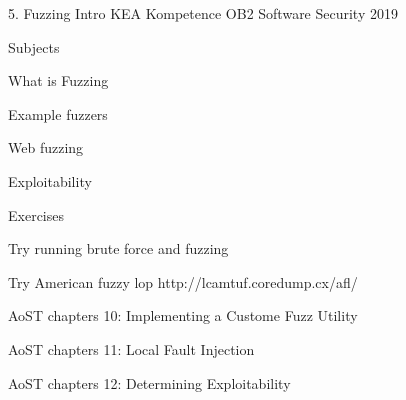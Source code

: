\documentclass[Screen16to9,17pt]{foils}
\begin{document}
\mytitlepage
{5. Fuzzing Intro}
{KEA Kompetence OB2 Software Security 2019}


\begin{list1}
\item Subjects
\begin{list2}
\item What is Fuzzing
\item Example fuzzers
\item Web fuzzing
\item Exploitability
\end{list2}
\item Exercises
\begin{list2}
\item Try running brute force and fuzzing
\item Try American fuzzy lop http://lcamtuf.coredump.cx/afl/
\end{list2}
\end{list1}


\begin{list1}
\item AoST chapters 10: Implementing a Custome Fuzz Utility
\item AoST chapters 11: Local Fault Injection
\item AoST chapters 12: Determining Exploitability
\end{list1}



\begin{list1}
\item
\end{list1}


\end{document}
